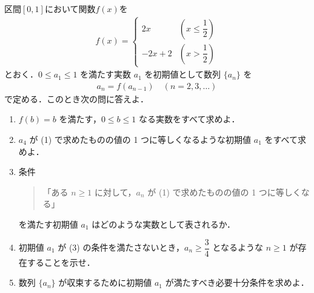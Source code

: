 \documentclass[../../main.tex]{subfiles}
\begin{document}
区間$[0,1]$において関数$f(x)$を
\begin{align}
  f(x) =
  \begin{cases}
    2x      & \left( x \leq \dfrac{1}{2} \right) \\
    -2x + 2 & \left( x > \dfrac{1}{2} \right)
  \end{cases}
\end{align}
とおく．$0 \leq a_1 \leq 1$ を満たす実数 $a_1$ を初期値として数列 $\{a_n\}$ を
\begin{align}
  a_n = f(a_{n-1}) \quad (n = 2, 3, \ldots)
\end{align}
で定める．このとき次の問に答えよ．

\begin{enumerate}
  \item $f(b) = b$ を満たす，$0 \leq b \leq 1$ なる実数をすべて求めよ．
  \item $a_4$ が (1) で求めたものの値の 1 つに等しくなるような初期値 $a_1$ をすべて求めよ．
  \item 条件
    \begin{quote}
      「ある $n \geq 1$ に対して，$a_n$ が (1) で求めたものの値の 1 つに等しくなる」
    \end{quote}
    を満たす初期値 $a_1$ はどのような実数として表されるか．
  \item 初期値 $a_1$ が (3) の条件を満たさないとき，$a_n \ge \dfrac{3}{4}$ となるような $n \geq 1$ が存在することを示せ．
  \item 数列 $\{a_n\}$ が収束するために初期値 $a_1$ が満たすべき必要十分条件を求めよ．
\end{enumerate}
\end{document}

